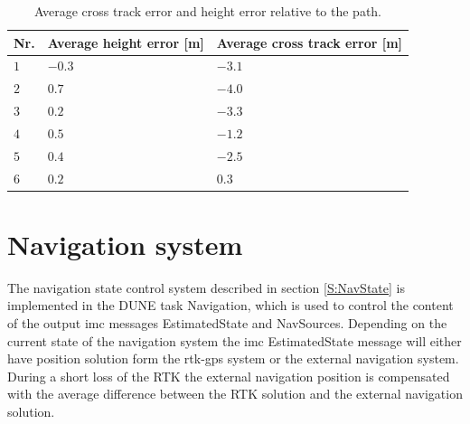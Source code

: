 \begin{table}[H]
\centering
\begin{tabular}{| l | l | l |}
\hline
\textbf{Nr.} 	& \textbf{Average height error [m]} 	& \textbf{Average cross track error [m]}  \\ \hline
$1$				& $-0.3$							& $-3.1$								\\ \hline
$2$				& $0.7$							& $-4.0$								\\ \hline
$3$				& $0.2$							& $-3.3$								\\ \hline
$4$				& $0.5$							& $-1.2$								\\ \hline
$5$				& $0.4$							& $-2.5$								\\ \hline
$6$				& $0.2$							& $0.3$								\\ \hline
\end{tabular}
\caption{Average cross track error and height error relative to the path.}
\label{Tb:SILAverageCrossHeight}
\end{table}
\section{Navigation system}\label{IMP:NavSys}
The navigation state control system described in section \ref{S:NavState} is implemented in the DUNE task Navigation, which is used to control the content of the output \gls{imc} messages EstimatedState and NavSources. Depending on the current state of the navigation system the \gls{imc} EstimatedState message will either have position solution form the \gls{rtk-gps} system or the external navigation system. During a short loss of the RTK the external navigation position is compensated with the average difference between the RTK solution and the external navigation solution.
